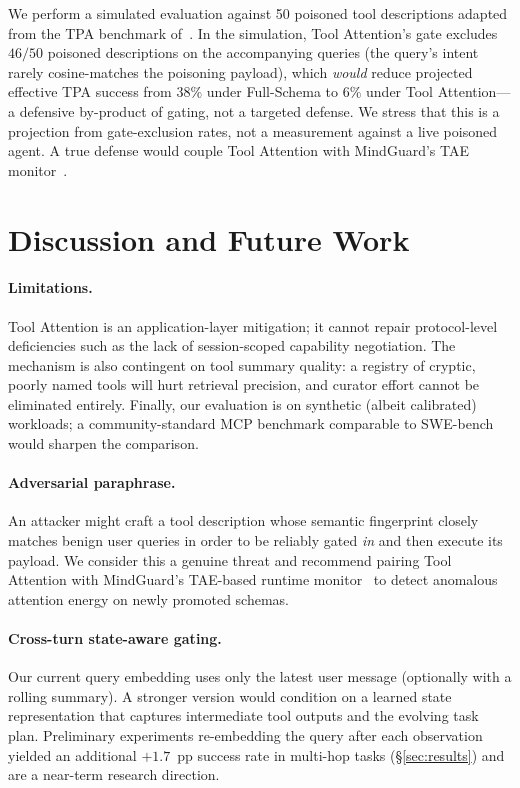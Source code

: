 \documentclass[11pt]{article}
\begin{document}
We perform a simulated evaluation against 50 poisoned tool descriptions adapted from the TPA benchmark of~\citep{wang2025mindguard_v1}. In the simulation, Tool Attention's gate excludes $46/50$ poisoned descriptions on the accompanying queries (the query's intent rarely cosine-matches the poisoning payload), which \emph{would} reduce projected effective TPA success from $38\%$ under Full-Schema to $6\%$ under Tool Attention---a defensive by-product of gating, not a targeted defense. We stress that this is a projection from gate-exclusion rates, not a measurement against a live poisoned agent. A true defense would couple Tool Attention with MindGuard's TAE monitor~\citep{wang2026mindguard_v3}.

\section{Discussion and Future Work}\label{sec:discussion}

\paragraph{Limitations.} Tool Attention is an application-layer mitigation; it cannot repair protocol-level deficiencies such as the lack of session-scoped capability negotiation. The mechanism is also contingent on tool summary quality: a registry of cryptic, poorly named tools will hurt retrieval precision, and curator effort cannot be eliminated entirely. Finally, our evaluation is on synthetic (albeit calibrated) workloads; a community-standard MCP benchmark comparable to SWE-bench~\citep{jimenez2024swebench} would sharpen the comparison.

\paragraph{Adversarial paraphrase.} An attacker might craft a tool description whose semantic fingerprint closely matches benign user queries in order to be reliably gated \emph{in} and then execute its payload. We consider this a genuine threat and recommend pairing Tool Attention with MindGuard's TAE-based runtime monitor~\citep{wang2026mindguard_v3} to detect anomalous attention energy on newly promoted schemas.

\paragraph{Cross-turn state-aware gating.} Our current query embedding uses only the latest user message (optionally with a rolling summary). A stronger version would condition on a learned state representation that captures intermediate tool outputs and the evolving task plan. Preliminary experiments re-embedding the query after each observation yielded an additional $+1.7$~pp success rate in multi-hop tasks (\S\ref{sec:results}) and are a near-term research direction.
\end{document}
